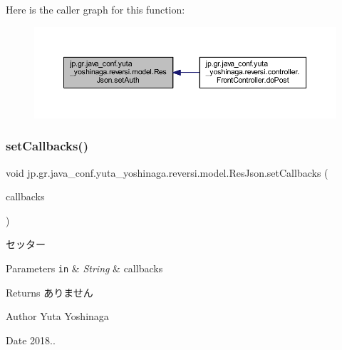 Here is the caller graph for this function\+:\nopagebreak
\begin{figure}[H]
\begin{center}
\leavevmode
\includegraphics[width=350pt]{classjp_1_1gr_1_1java__conf_1_1yuta__yoshinaga_1_1reversi_1_1model_1_1_res_json_aec94a5246bf7245af19f8f72100e986c_icgraph}
\end{center}
\end{figure}
\mbox{\label{classjp_1_1gr_1_1java__conf_1_1yuta__yoshinaga_1_1reversi_1_1model_1_1_res_json_a2c93a1f6a03a04909da59238c7e68ca3}} 
\subsubsection{\texorpdfstring{set\+Callbacks()}{setCallbacks()}}
{\footnotesize\ttfamily void jp.\+gr.\+java\+\_\+conf.\+yuta\+\_\+yoshinaga.\+reversi.\+model.\+Res\+Json.\+set\+Callbacks (\begin{DoxyParamCaption}\item[{\hyperlink{classjp_1_1gr_1_1java__conf_1_1yuta__yoshinaga_1_1reversi_1_1model_1_1_callbacks_json}{Callbacks\+Json}}]{callbacks }\end{DoxyParamCaption})}



セッター 


\begin{DoxyParams}[1]{Parameters}
\mbox{\tt in}  & {\em String} & callbacks \\
\hline
\end{DoxyParams}
\begin{DoxyReturn}{Returns}
ありません 
\end{DoxyReturn}
\begin{DoxyAuthor}{Author}
Yuta Yoshinaga 
\end{DoxyAuthor}
\begin{DoxyDate}{Date}
2018.. 
\end{DoxyDate}


